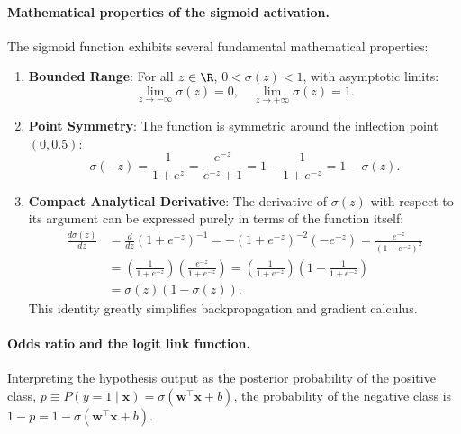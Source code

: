 \paragraph{Mathematical properties of the sigmoid activation.}
The sigmoid function exhibits several fundamental mathematical properties:
\begin{enumerate}
  \item \textbf{Bounded Range}: For all $z \in \R$, $0 < \sigma(z) < 1$, with asymptotic limits:
    \begin{equation}
    \lim_{z \to -\infty} \sigma(z) = 0, \quad \lim_{z \to +\infty} \sigma(z) = 1.
    \end{equation}
  \item \textbf{Point Symmetry}: The function is symmetric around the inflection point $(0, 0.5)$:
    \begin{equation}
    \sigma(-z) = \frac{1}{1 + e^z} = \frac{e^{-z}}{e^{-z} + 1} = 1 - \frac{1}{1 + e^{-z}} = 1 - \sigma(z).
    \label{eq:sigmoid_symmetry}
    \end{equation}
  \item \textbf{Compact Analytical Derivative}: The derivative of $\sigma(z)$ with respect to its argument can be expressed purely in terms of the function itself:
    \begin{align}
    \frac{d\sigma(z)}{dz} &= \frac{d}{dz} (1 + e^{-z})^{-1} = -(1 + e^{-z})^{-2} (-e^{-z}) = \frac{e^{-z}}{(1 + e^{-z})^2} \nonumber \\
    &= \left( \frac{1}{1 + e^{-z}} \right) \left( \frac{e^{-z}}{1 + e^{-z}} \right) = \left( \frac{1}{1 + e^{-z}} \right) \left( 1 - \frac{1}{1 + e^{-z}} \right) \nonumber \\
    &= \sigma(z)(1 - \sigma(z)).
    \label{eq:sigmoid_derivative_proof}
    \end{align}
    This identity greatly simplifies backpropagation and gradient calculus.
\end{enumerate}

\paragraph{Odds ratio and the logit link function.}
Interpreting the hypothesis output as the posterior probability of the positive class, $p \equiv P(y=1 \mid \mathbf{x}) = \sigma(\mathbf{w}^\top \mathbf{x} + b)$, the probability of the negative class is $1 - p = 1 - \sigma(\mathbf{w}^\top \mathbf{x} + b)$.

